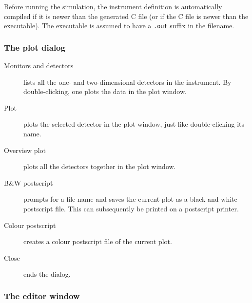 Before running the simulation, the instrument definition is
automatically compiled if it is newer than the generated C file (or if the C file
is newer than the executable). The executable is
assumed to have a \verb+.out+ suffix in the filename.


\subsubsection{The plot dialog}
\begin{description}
\item[Monitors and detectors] lists all the one- and
  two-dimensional detectors in the instrument. By double-clicking, one plots
  the data in the plot window.
\item[Plot] plots the selected detector in the plot window, just
  like double-clicking its name.
\item[Overview plot] plots all the detectors together in the plot
  window.
\item[B\&W postscript] prompts for a file name and saves the
  current plot as a black and white postscript file. This can
  subsequently be printed on a postscript printer.
\item[Colour postscript] creates a colour postscript file of the
  current plot.
\item[Close] ends the dialog.
\end{description}


\subsubsection{The editor window}

